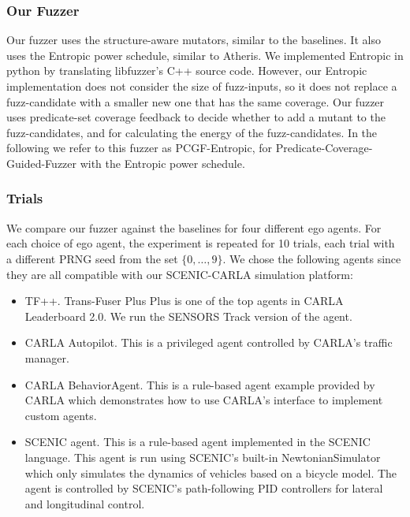 \subsubsection{Our Fuzzer}
Our fuzzer uses the structure-aware mutators, similar to the baselines.
%
It also uses the Entropic power schedule, similar to Atheris.
%
We implemented Entropic in python by translating libfuzzer's C++ source code.
%
However, our Entropic implementation does not consider the size of fuzz-inputs, so it does not replace a fuzz-candidate with a smaller new one that has the same coverage.
%
Our fuzzer uses predicate-set coverage feedback to decide whether to add a mutant to the fuzz-candidates, and for calculating the energy of the fuzz-candidates.
%
In the following we refer to this fuzzer as PCGF-Entropic, for Predicate-Coverage-Guided-Fuzzer with the Entropic power schedule.


\subsubsection{Trials}
We compare our fuzzer against the baselines for four different ego agents.
%
For each choice of ego agent, the experiment is repeated for 10 trials, each trial with a different PRNG seed from the set $\{ 0, \dots, 9 \}$.
%
We chose the following agents since they are all compatible with our SCENIC-CARLA simulation platform:
\begin{itemize}
    \item TF++.
        Trans-Fuser Plus Plus \cite{Jaeger.2023} is one of the top agents in CARLA Leaderboard 2.0.
        We run the SENSORS Track version of the agent.
    \item CARLA Autopilot.
        This is a privileged agent controlled by CARLA's traffic manager.
    \item CARLA BehaviorAgent.
        This is a rule-based agent example provided by CARLA which demonstrates how to use CARLA's interface to implement custom agents.
    \item SCENIC agent.
        This is a rule-based agent implemented in the SCENIC language.
        This agent is run using SCENIC's built-in NewtonianSimulator which only simulates the dynamics of vehicles based on a bicycle model.
        The agent is controlled by SCENIC's path-following PID controllers for lateral and longitudinal control.
\end{itemize}


